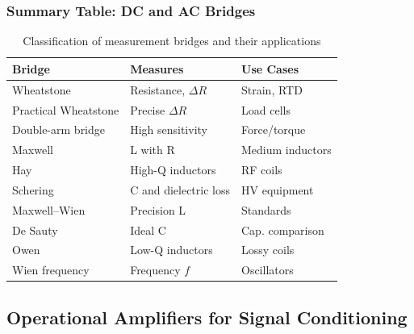 \begin{frame}
	\frametitle{Summary Table: DC and AC Bridges}
	\small
	\begin{table}
		\centering
		\begin{tabular}{@{}p{2.5cm} p{4.5cm} p{4cm}@{}}
			\toprule
			\textbf{Bridge} & \textbf{Measures} & \textbf{Use Cases} \\
			\midrule
			Wheatstone            & Resistance, $\Delta R$     & Strain, RTD \\
			Practical Wheatstone  & Precise $\Delta R$         & Load cells \\
			Double-arm bridge     & High sensitivity           & Force/torque \\
			Maxwell               & L with R                   & Medium inductors \\
			Hay                   & High-Q inductors           & RF coils \\
			Schering              & C and dielectric loss      & HV equipment \\
			Maxwell–Wien          & Precision L                & Standards \\
			De Sauty              & Ideal C                    & Cap. comparison \\
			Owen                  & Low-Q inductors            & Lossy coils \\
			Wien frequency        & Frequency $f$              & Oscillators \\
			\bottomrule
		\end{tabular}
		\caption{Classification of measurement bridges and their applications}
		\label{tab:measurement_bridges}
	\end{table}
\end{frame}

\subsection{Operational Amplifiers for Signal Conditioning}

